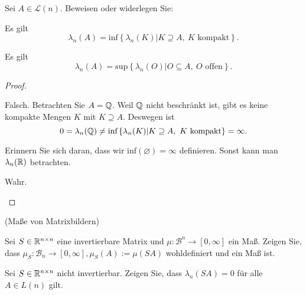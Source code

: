 \begin{Problem}
	Sei $A\in \mathcal{L}(n)$. Beweisen oder widerlegen Sie:
	\begin{parts}
	\item Es gilt
		\[
			\lambda_n(A)=\text{inf}\left\{ \lambda_n(K)|K\supseteq A,~K\text{ kompakt} \right\} 
		.\] 
	\item Es gilt
		\[
			\lambda_n(A)=\text{sup}\left\{ \lambda_n(O)|O\subseteq A,~O\text{ offen} \right\} 
		.\] 
	\end{parts}
\end{Problem}
\begin{proof}
	\begin{parts}
	\item Falsch. Betrachten Sie $A=\mathbb{Q}$. Weil $\mathbb{Q}$ nicht beschränkt ist, gibt es keine kompakte Mengen $K$ mit $K\supseteq A$. Deswegen ist 
		\[0=\lambda_n(\mathbb{Q})\neq\text{inf}\left\{ \lambda_n(K)|K\supseteq A,~K\text{ kompakt} \right\}=\infty.\] 
		\begin{tcolorbox}[title=Bemerkung]
			Erinnern Sie sich daran, dass wir $\text{inf}(\varnothing)=\infty$ definieren. Sonst kann man $\lambda_n(\mathbb{R})$ betrachten.
		\end{tcolorbox}
	\item Wahr. 
	\end{parts}
\end{proof}
\begin{Problem}
	(Maße von Matrixbildern) 
	\begin{parts}
	\item Sei $S \in \mathbb{R}^{n\times n}$ eine invertierbare Matrix und $\mu : \mathcal{B}^n \to [0, \infty]$ ein Maß. Zeigen Sie, dass $\mu_S : \mathcal{B}_n\to [0,\infty],\mu_S(A):=\mu(SA)$ wohldefiniert und ein Maß ist.
	\item Sei $S \in \mathbb{R}^{n\times n}$ nicht invertierbar. Zeigen Sie, dass $\lambda_n(SA)=0$ für alle $A \in L(n)$ gilt.
	\end{parts}
\end{Problem}
